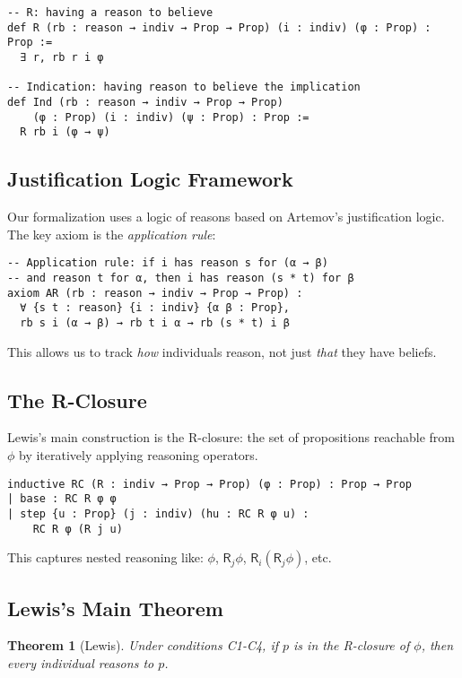 \documentclass[11pt]{article}
\newtheorem{theorem}{Theorem}
\newcommand{\Roperator}{\mathsf{R}}
\begin{document}
\begin{verbatim}
-- R: having a reason to believe
def R (rb : reason → indiv → Prop → Prop) (i : indiv) (φ : Prop) : Prop :=
  ∃ r, rb r i φ

-- Indication: having reason to believe the implication
def Ind (rb : reason → indiv → Prop → Prop) 
    (φ : Prop) (i : indiv) (ψ : Prop) : Prop :=
  R rb i (φ → ψ)
\end{verbatim}

\subsection{Justification Logic Framework}

Our formalization uses a logic of reasons based on Artemov's justification logic. 
The key axiom is the \emph{application rule}:

\begin{verbatim}
-- Application rule: if i has reason s for (α → β) 
-- and reason t for α, then i has reason (s * t) for β
axiom AR (rb : reason → indiv → Prop → Prop) :
  ∀ {s t : reason} {i : indiv} {α β : Prop},
  rb s i (α → β) → rb t i α → rb (s * t) i β
\end{verbatim}

This allows us to track \emph{how} individuals reason, not just \emph{that} they 
have beliefs.

\subsection{The R-Closure}

Lewis's main construction is the R-closure: the set of propositions reachable 
from $\phi$ by iteratively applying reasoning operators.

\begin{verbatim}
inductive RC (R : indiv → Prop → Prop) (φ : Prop) : Prop → Prop
| base : RC R φ φ
| step {u : Prop} (j : indiv) (hu : RC R φ u) : 
    RC R φ (R j u)
\end{verbatim}

This captures nested reasoning like: $\phi$, $\Roperator_j \phi$, 
$\Roperator_i (\Roperator_j \phi)$, etc.

\subsection{Lewis's Main Theorem}

\begin{theorem}[Lewis]
Under conditions C1-C4, if $p$ is in the R-closure of $\phi$, then every 
individual reasons to $p$.
\end{theorem}
\end{document}
